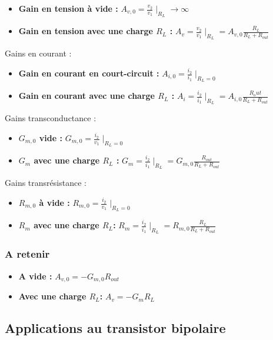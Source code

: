 \documentclass[]{article}
\begin{document}
\begin{itemize}
\item \textbf{Gain en tension à vide :} $A_{v,0} = \frac{v_2}{v_1}\mid_{R_L}\rightarrow\infty$
\item \textbf{Gain en tension avec une charge $R_L$ :} $ A_v =  \frac{v_2}{v_1}\mid_{R_L} = A_{v,0}\frac{R_L}{R_L + R_{out}}$
\end{itemize}
Gains en courant :
\begin{itemize}
\item \textbf{Gain en courant en court-circuit :} $A_{i,0} = \frac{i_2}{i_1}\mid_{R_L=0}$
\item \textbf{Gain en courant avec une charge $R_L$ :} $ A_i =  \frac{i_2}{i_1}\mid_{R_L} = A_{i,0}\frac{R_out}{R_L + R_{out}}$
\end{itemize}
Gains transconductance :
\begin{itemize}
\item \textbf{$G_{m,0}$ vide :} $G_{m,0} = \frac{i_2}{v_1}\mid_{R_L=0}$
\item \textbf{$G_{m}$ avec une charge $R_L$ :} $ G_m =  \frac{i_2}{i_1}\mid_{R_L} = G_{m,0}\frac{R_{out}}{R_L + R_{out}}$
\end{itemize}
Gains transrésistance :
\begin{itemize}
\item \textbf{$R_{m,0}$ à vide :} $R_{m,0} = \frac{i_2}{v_1}\mid_{R_L=0}$
\item \textbf{$R_{m}$ avec une charge  $R_L$:} $ R_m =  \frac{i_2}{i_1}\mid_{R_L} = R_{m,0}\frac{R_L}{R_L + R_{out}}$
\end{itemize}

\subsubsection{A retenir}
 \begin{itemize}
\item \textbf{A vide :} $A_{v,0} = - G_{m,0}R_{out}$
\item \textbf{Avec une charge  $R_L$:} $A_{v} = - G_{m}R_{L}$
\end{itemize}

\subsection{Applications au transistor bipolaire}
\end{document}
